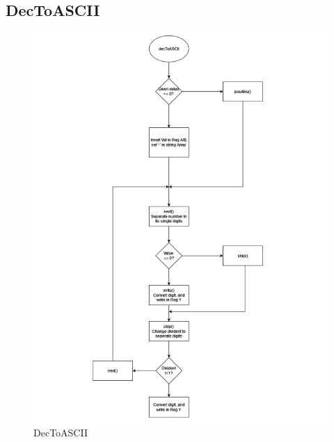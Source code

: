 \documentclass[a4paper,12pt]{article}
\begin{document}
\subsection{DecToASCII}
\begin{figure}[H]
    \centering
    \includegraphics[width=1\textwidth]{diagrams/decToASCII.png}
    \caption{DecToASCII}
    \label{fig:DecToASCII}
\end{figure}
\end{document}
